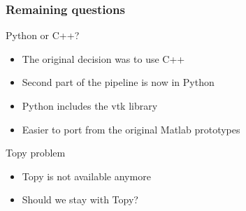 \begin{frame}

	\frametitle{Remaining questions}
	
	\begin{block}{Python or C++?}

	\begin{itemize}
	\item The original decision was to use C++ 
	\item Second part of the pipeline is now in Python
	\item Python includes the vtk library  
	\item Easier to port from the original Matlab prototypes
	\end{itemize}	
	\end{block}
	
	\begin{block}{Topy problem}
	\begin{itemize}
	\item Topy is not available anymore
	\item Should we stay with Topy?
	\end{itemize}

	\end{block}
	
\end{frame}


